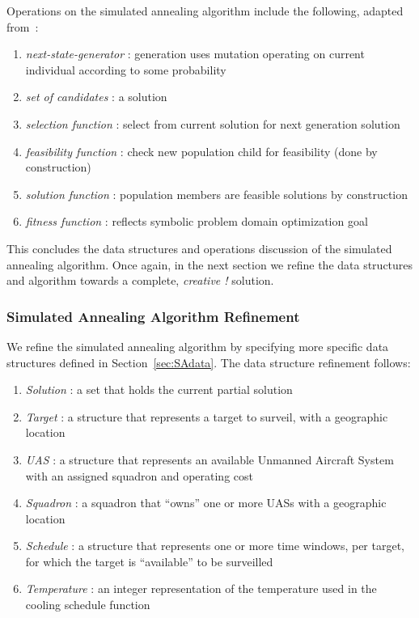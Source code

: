 \documentclass[conference]{IEEEtran}
\begin{document}
Operations on the simulated annealing algorithm include the following, adapted
from~\cite{lamontSAGS}:

\begin{enumerate}
  \item[] \emph{next-state-generator} : generation uses mutation operating on
    current individual according to some probability
  \item[] \emph{set of candidates} : a solution
  \item[] \emph{selection function} : select from current solution for next
    generation solution
  \item[] \emph{feasibility function} : check new population child for
    feasibility (done by construction)
  \item[] \emph{solution function} : population members are feasible solutions
    by construction
  \item[] \emph{fitness function} : reflects symbolic problem domain
    optimization goal
\end{enumerate}

This concludes the data structures and operations discussion of the simulated
annealing algorithm. Once again, in the next section we refine the data
structures and algorithm towards a complete, \emph{creative !} solution.


\subsubsection{Simulated Annealing Algorithm Refinement}

We refine the simulated annealing algorithm by specifying more specific data
structures defined in Section~\ref{sec:SAdata}. The data structure refinement
follows:

\begin{enumerate}
  \item[] \emph{Solution} : a set that holds the current partial solution
  \item[] \emph{Target} : a structure that represents a target to surveil, with
    a geographic location
  \item[] \emph{UAS} : a structure that represents an available Unmanned
    Aircraft System with an assigned squadron and operating cost
  \item[] \emph{Squadron} : a squadron that ``owns'' one or more UASs with a
    geographic location
  \item[] \emph{Schedule} : a structure that represents one or more time
    windows, per target, for which the target is ``available'' to be surveilled
  \item[] \emph{Temperature} : an integer representation of the temperature
    used in the cooling schedule function
\end{enumerate}
\end{document}

